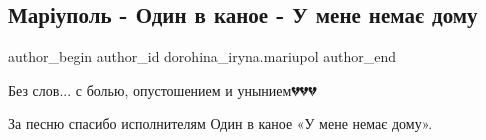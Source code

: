  
 
 
 
 

\subsection{ Маріуполь - Один в каное - У мене немає дому}
\label{sec:26_04_2022.fb.dorohina_iryna.mariupol.1._mar_upol___odin_v_k}

\ifcmt
 author_begin
   author_id dorohina_iryna.mariupol
 author_end
\fi

Без слов... с болью, опустошением и унынием💔💔💔

За песню спасибо исполнителям Один в каное «У мене немає дому».
